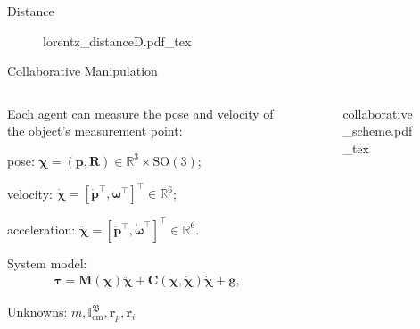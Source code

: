 \begin{frame}{Distance}
    \begin{figure}[ht!]
        \centering
        \def\svgwidth{.9\linewidth}
        {\scriptsize{lorentz_distanceD.pdf_tex}}
    \end{figure}
\end{frame}

\begin{frame}{Collaborative Manipulation}
    \begin{columns}[c]
        \begin{column}{0.4\linewidth}
            Each agent can measure the pose and velocity of the object's measurement point:

            \quad pose: $\boldsymbol{\chi} = (\mathbf{p}, \mathbf{R}) \in \mathbb{R}^3\times \text{SO}(3)$;
            
            \quad velocity: $\dot{\boldsymbol{\chi}} = \left[\dot{\mathbf{p}}^\top, \boldsymbol{\omega}^\top \right]^\top\in\mathbb{R}^6$;
            
            \quad acceleration: $\ddot{\boldsymbol{\chi}} = \left[\ddot{\mathbf{p}}^\top, \dot{\boldsymbol{\omega}}^\top \right]^\top\in\mathbb{R}^6$.

            System model:
            \begin{align*}
                \boldsymbol{\tau } = \mathbf {M}(\boldsymbol{\chi})\ddot{\boldsymbol{\chi}} + \mathbf {C}(\boldsymbol{\chi},\dot{\boldsymbol{\chi}})\dot{\boldsymbol{\chi}} + \mathbf{g},
            \end{align*}

            Unknowns: $m, \mathbb{I}_\text{cm}^\mathfrak{B}, \mathbf{r}_p, \mathbf{r}_i$
        \end{column}
        \begin{column}{0.6\linewidth}
            \begin{figure}[ht!]
                \centering
                \def\svgwidth{\linewidth}
                {\scriptsize{collaborative_scheme.pdf_tex}}
            \end{figure}
        \end{column}
    \end{columns}
\end{frame}

